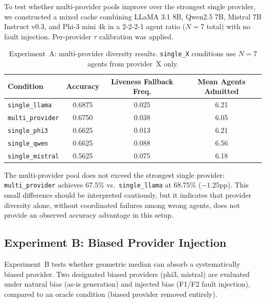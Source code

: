 \documentclass[11pt]{article}
\begin{document}
To test whether multi-provider pools improve over the strongest single provider,
we constructed a mixed cache combining LLaMA 3.1 8B, Qwen2.5 7B, Mistral 7B
Instruct v0.3, and Phi-3 mini 4k in a 2-2-2-1 agent ratio ($N=7$ total) with
no fault injection. Per-provider $\tau$ calibration was applied.

\begin{table}[h]
\centering
\caption{Experiment~A: multi-provider diversity results. \texttt{single\_X}
  conditions use $N=7$ agents from provider~X only.}
\label{tab:exp-a}
\small
\begin{tabular}{lccc}
\toprule
\textbf{Condition} & \textbf{Accuracy}
  & \textbf{Liveness Fallback Freq.} & \textbf{Mean Agents Admitted} \\
\midrule
\texttt{single\_llama}    & 0.6875 & 0.025 & 6.21 \\
\texttt{multi\_provider}  & 0.6750 & 0.038 & 6.05 \\
\texttt{single\_phi3}     & 0.6625 & 0.013 & 6.21 \\
\texttt{single\_qwen}     & 0.6625 & 0.088 & 6.56 \\
\texttt{single\_mistral}  & 0.5625 & 0.075 & 6.18 \\
\bottomrule
\end{tabular}
\end{table}

The multi-provider pool does not exceed the strongest single provider:
\texttt{multi\_provider} achieves 67.5\% vs.\ \texttt{single\_llama} at 68.75\%
($-1.25$pp). This small difference should be interpreted cautiously, but it
indicates that provider diversity alone, without coordinated failures among wrong
agents, does not provide an observed accuracy advantage in this setup.

\subsection{Experiment B: Biased Provider Injection}
\label{sec:exp-b}

Experiment~B tests whether geometric median can absorb a systematically biased
provider. Two designated biased providers (phi3, mistral) are evaluated under
natural bias (as-is generation) and injected bias (F1/F2 fault injection),
compared to an oracle condition (biased provider removed entirely).
\end{document}
